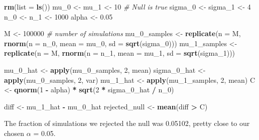 \documentclass[
]{article}
\newenvironment{Shaded}{\begin{snugshade}}{\end{snugshade}}
\newcommand{\CommentTok}[1]{\textcolor[rgb]{0.56,0.35,0.01}{\textit{#1}}}
\newcommand{\DataTypeTok}[1]{\textcolor[rgb]{0.13,0.29,0.53}{#1}}
\newcommand{\DecValTok}[1]{\textcolor[rgb]{0.00,0.00,0.81}{#1}}
\newcommand{\FloatTok}[1]{\textcolor[rgb]{0.00,0.00,0.81}{#1}}
\newcommand{\KeywordTok}[1]{\textcolor[rgb]{0.13,0.29,0.53}{\textbf{#1}}}
\newcommand{\NormalTok}[1]{#1}
\newcommand{\OperatorTok}[1]{\textcolor[rgb]{0.81,0.36,0.00}{\textbf{#1}}}
\newcommand{\StringTok}[1]{\textcolor[rgb]{0.31,0.60,0.02}{#1}}
\begin{document}
\begin{Shaded}
\begin{Highlighting}[]
\KeywordTok{rm}\NormalTok{(}\DataTypeTok{list =} \KeywordTok{ls}\NormalTok{())}
\NormalTok{mu_}\DecValTok{0}\NormalTok{ <-}\StringTok{ }\NormalTok{mu_}\DecValTok{1}\NormalTok{ <-}\StringTok{ }\DecValTok{10} \CommentTok{# Null is true}
\NormalTok{sigma_}\DecValTok{0}\NormalTok{ <-}\StringTok{ }\NormalTok{sigma_}\DecValTok{1}\NormalTok{ <-}\StringTok{ }\DecValTok{4}
\NormalTok{n_}\DecValTok{0}\NormalTok{ <-}\StringTok{ }\NormalTok{n_}\DecValTok{1}\NormalTok{ <-}\StringTok{ }\DecValTok{1000}
\NormalTok{alpha <-}\StringTok{ }\FloatTok{0.05}

\NormalTok{M <-}\StringTok{ }\DecValTok{100000} \CommentTok{# number of simulations}
\NormalTok{mu_}\DecValTok{0}\NormalTok{_samples <-}\StringTok{ }\KeywordTok{replicate}\NormalTok{(}\DataTypeTok{n =}\NormalTok{ M, }\KeywordTok{rnorm}\NormalTok{(}\DataTypeTok{n =}\NormalTok{ n_}\DecValTok{0}\NormalTok{, }\DataTypeTok{mean =}\NormalTok{ mu_}\DecValTok{0}\NormalTok{, }\DataTypeTok{sd =} \KeywordTok{sqrt}\NormalTok{(sigma_}\DecValTok{0}\NormalTok{)))}
\NormalTok{mu_}\DecValTok{1}\NormalTok{_samples <-}\StringTok{ }\KeywordTok{replicate}\NormalTok{(}\DataTypeTok{n =}\NormalTok{ M, }\KeywordTok{rnorm}\NormalTok{(}\DataTypeTok{n =}\NormalTok{ n_}\DecValTok{1}\NormalTok{, }\DataTypeTok{mean =}\NormalTok{ mu_}\DecValTok{1}\NormalTok{, }\DataTypeTok{sd =} \KeywordTok{sqrt}\NormalTok{(sigma_}\DecValTok{1}\NormalTok{)))}

\NormalTok{mu_}\DecValTok{0}\NormalTok{_hat <-}\StringTok{ }\KeywordTok{apply}\NormalTok{(mu_}\DecValTok{0}\NormalTok{_samples, }\DecValTok{2}\NormalTok{, mean)}
\NormalTok{sigma_}\DecValTok{0}\NormalTok{_hat <-}\StringTok{ }\KeywordTok{apply}\NormalTok{(mu_}\DecValTok{0}\NormalTok{_samples, }\DecValTok{2}\NormalTok{, var)}
\NormalTok{mu_}\DecValTok{1}\NormalTok{_hat <-}\StringTok{ }\KeywordTok{apply}\NormalTok{(mu_}\DecValTok{1}\NormalTok{_samples, }\DecValTok{2}\NormalTok{, mean)}
\NormalTok{C <-}\StringTok{ }\KeywordTok{qnorm}\NormalTok{(}\DecValTok{1} \OperatorTok{-}\StringTok{ }\NormalTok{alpha) }\OperatorTok{*}\StringTok{ }\KeywordTok{sqrt}\NormalTok{(}\DecValTok{2} \OperatorTok{*}\StringTok{ }\NormalTok{sigma_}\DecValTok{0}\NormalTok{_hat }\OperatorTok{/}\StringTok{ }\NormalTok{n_}\DecValTok{0}\NormalTok{)}

\NormalTok{diff <-}\StringTok{ }\NormalTok{mu_}\DecValTok{1}\NormalTok{_hat }\OperatorTok{-}\StringTok{ }\NormalTok{mu_}\DecValTok{0}\NormalTok{_hat}
\NormalTok{rejected_null <-}\StringTok{ }\KeywordTok{mean}\NormalTok{(diff }\OperatorTok{>}\StringTok{ }\NormalTok{C)}
\end{Highlighting}
\end{Shaded}

The fraction of simulations we rejected the null was 0.05102, pretty
close to our chosen \(\alpha\) = 0.05.
\end{document}
